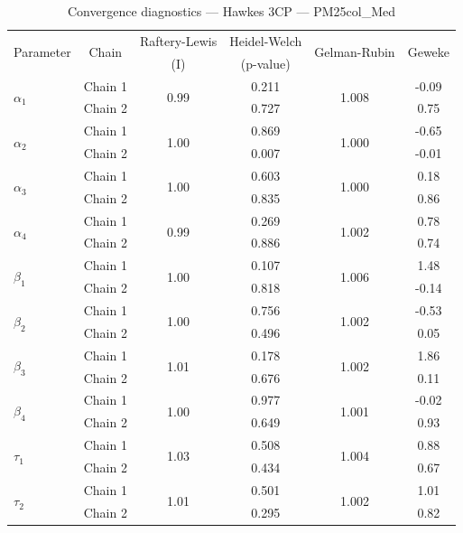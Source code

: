 \begin{table}[H]
\centering
\caption{Convergence diagnostics — Hawkes 3CP — PM25col_Med}
\begin{tabular}{lccccc}
\toprule
\multirow{2}{*}{Parameter} & \multirow{2}{*}{Chain} & Raftery-Lewis & Heidel-Welch & \multirow{2}{*}{Gelman-Rubin} & \multirow{2}{*}{Geweke} \\
 & & (I) & (p-value) & & (z) \\
\midrule
\multirow{2}{*}{$\alpha_1$} & Chain 1 & \multirow{2}{*}{0.99} & 0.211 & \multirow{2}{*}{1.008} & -0.09 \\
 & Chain 2 & & 0.727 & & 0.75 \\
\multirow{2}{*}{$\alpha_2$} & Chain 1 & \multirow{2}{*}{1.00} & 0.869 & \multirow{2}{*}{1.000} & -0.65 \\
 & Chain 2 & & 0.007 & & -0.01 \\
\multirow{2}{*}{$\alpha_3$} & Chain 1 & \multirow{2}{*}{1.00} & 0.603 & \multirow{2}{*}{1.000} & 0.18 \\
 & Chain 2 & & 0.835 & & 0.86 \\
\multirow{2}{*}{$\alpha_4$} & Chain 1 & \multirow{2}{*}{0.99} & 0.269 & \multirow{2}{*}{1.002} & 0.78 \\
 & Chain 2 & & 0.886 & & 0.74 \\
\midrule
\multirow{2}{*}{$\beta_1$} & Chain 1 & \multirow{2}{*}{1.00} & 0.107 & \multirow{2}{*}{1.006} & 1.48 \\
 & Chain 2 & & 0.818 & & -0.14 \\
\multirow{2}{*}{$\beta_2$} & Chain 1 & \multirow{2}{*}{1.00} & 0.756 & \multirow{2}{*}{1.002} & -0.53 \\
 & Chain 2 & & 0.496 & & 0.05 \\
\multirow{2}{*}{$\beta_3$} & Chain 1 & \multirow{2}{*}{1.01} & 0.178 & \multirow{2}{*}{1.002} & 1.86 \\
 & Chain 2 & & 0.676 & & 0.11 \\
\multirow{2}{*}{$\beta_4$} & Chain 1 & \multirow{2}{*}{1.00} & 0.977 & \multirow{2}{*}{1.001} & -0.02 \\
 & Chain 2 & & 0.649 & & 0.93 \\
\midrule
\multirow{2}{*}{$\tau_1$} & Chain 1 & \multirow{2}{*}{1.03} & 0.508 & \multirow{2}{*}{1.004} & 0.88 \\
 & Chain 2 & & 0.434 & & 0.67 \\
\multirow{2}{*}{$\tau_2$} & Chain 1 & \multirow{2}{*}{1.01} & 0.501 & \multirow{2}{*}{1.002} & 1.01 \\
 & Chain 2 & & 0.295 & & 0.82 \\

\end{tabular}
\end{table}
